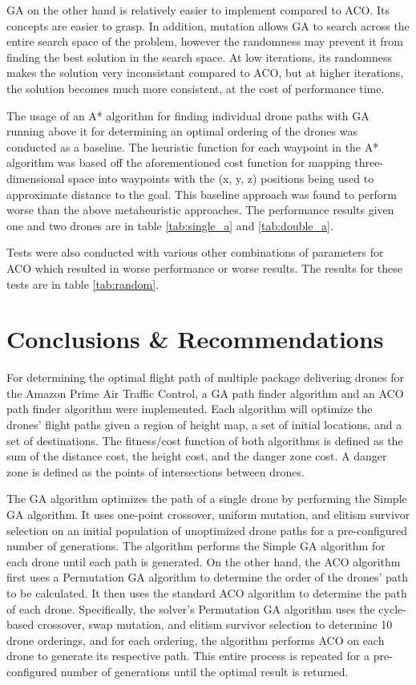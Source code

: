 \documentclass[conference]{IEEEtran}
\begin{document}
GA on the other hand is relatively easier to implement compared to ACO. Its concepts are easier to grasp. In addition, mutation allows GA to search across the entire search space of the problem, however the randomness may prevent it from finding the best solution in the search space. At low iterations, its randomness makes the solution very inconsistant compared to ACO, but at higher iterations, the solution becomes much more consistent, at the cost of performance time.

The usage of an A* algorithm for finding individual drone paths with GA running above it for determining an optimal ordering of the drones was conducted as a baseline. The heuristic function for each waypoint in the A* algorithm was based off the aforementioned cost function for mapping three-dimensional space into waypoints with the (x, y, z) positions being used to approximate distance to the goal. This baseline approach was found to perform worse than the above metaheuristic approaches. The performance results given one and two drones are in table \ref{tab:single_a} and \ref{tab:double_a}.

Tests were also conducted with various other combinations of parameters for ACO which resulted in worse performance or worse results. The results for these tests are in table \ref{tab:random}.

\section{Conclusions \& Recommendations}
For determining the optimal flight path of multiple package delivering drones for the Amazon Prime Air Traffic Control, a GA path finder algorithm and an ACO path finder algorithm were implemented. Each algorithm will optimize the drones' flight paths given a region of height map, a set of initial locations, and a set of destinations. The fitness/cost function of both algorithms is defined as the sum of the distance cost, the height cost, and the danger zone cost. A danger zone is defined as the points of intersections between drones.

The GA algorithm optimizes the path of a single drone by performing the Simple GA algorithm. It uses one-point crossover, uniform mutation, and elitism survivor selection on an initial population of unoptimized drone paths for a pre-configured number of generations. The algorithm performs the Simple GA algorithm for each drone until each path is generated. On the other hand, the ACO algorithm first uses a Permutation GA algorithm to determine the order of the drones' path to be calculated. It then uses the standard ACO algorithm to determine the path of each drone. Specifically, the solver's Permutation GA algorithm uses the cycle-based crossover, swap mutation, and elitism survivor selection to determine 10 drone orderings, and for each ordering, the algorithm performs ACO on each drone to generate its respective path. This entire process is repeated for a pre-configured number of generations until the optimal result is returned.
\end{document}
